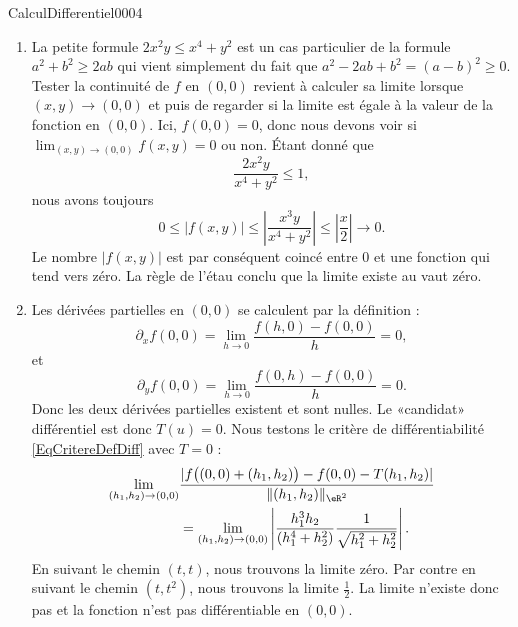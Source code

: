 \begin{corrige}{CalculDifferentiel0004}

	\begin{enumerate}
		\item
			La petite formule $2x^2y\leq x^4+y^2$ est un cas particulier de la formule $a^2+b^2\geq 2ab$ qui vient simplement du fait que $a^2-2ab+b^2=(a-b)^2\geq 0$. Tester la continuité de $f$ en $(0,0)$ revient à calculer sa limite lorsque $(x,y)\to (0,0)$ et puis de regarder si la limite est égale à la valeur de la fonction en $(0,0)$. Ici, $f(0,0)=0$, donc nous devons voir si $\lim_{(x,y)\to(0,0)}f(x,y)=0$ ou non. Étant donné que 
			\begin{equation}
				\frac{ 2x^2y }{ x^4+y^2 }\leq 1,
			\end{equation}
			nous avons toujours
			\begin{equation}
				0\leq | f(x,y) |\leq \left| \frac{ x^3y }{ x^4+y^2 } \right| \leq\left| \frac{ x }{ 2 } \right| \to 0.
			\end{equation}
			Le nombre $| f(x,y) |$ est par conséquent coincé entre $0$ et une fonction qui tend vers zéro. La règle de l'étau conclu que la limite existe au vaut zéro.

		\item
			Les dérivées partielles en $(0,0)$ se calculent par la définition :
			\begin{equation}
				\partial_xf(0,0)=\lim_{h\to 0} \frac{ f(h,0)-f(0,0) }{ h }=0,
			\end{equation}
			et
			\begin{equation}
				\partial_yf(0,0)=\lim_{h\to 0} \frac{ f(0,h)-f(0,0) }{ h }=0.
			\end{equation}
			Donc les deux dérivées partielles existent et sont nulles. Le «candidat» différentiel est donc $T(u)=0$. Nous testons le critère de différentiabilité \eqref{EqCritereDefDiff} avec $T=0$ :
			\begin{equation}
				\begin{aligned}[]
				\lim_{(h_1,h_2)\to (0,0)} &\frac{ | f\big( (0,0)+(h_1,h_2) \big)-f(0,0)-T(h_1,h_2) | }{ \| (h_1,h_2) \|_{\eR^2} }\\
					&=\lim_{(h_1,h_2)\to(0,0)}\left| \frac{ h_1^3h_2 }{ (h_1^4+h_2^2) }\frac{1}{ \sqrt{h_1^2+h_2^2} } \right|.
				\end{aligned}
			\end{equation}
			En suivant le chemin $(t,t)$, nous trouvons la limite zéro. Par contre en suivant le chemin $(t,t^2)$, nous trouvons la limite $\frac{ 1 }{2}$. La limite n'existe donc pas et la fonction n'est pas différentiable en $(0,0)$.
	\end{enumerate}

\end{corrige}
